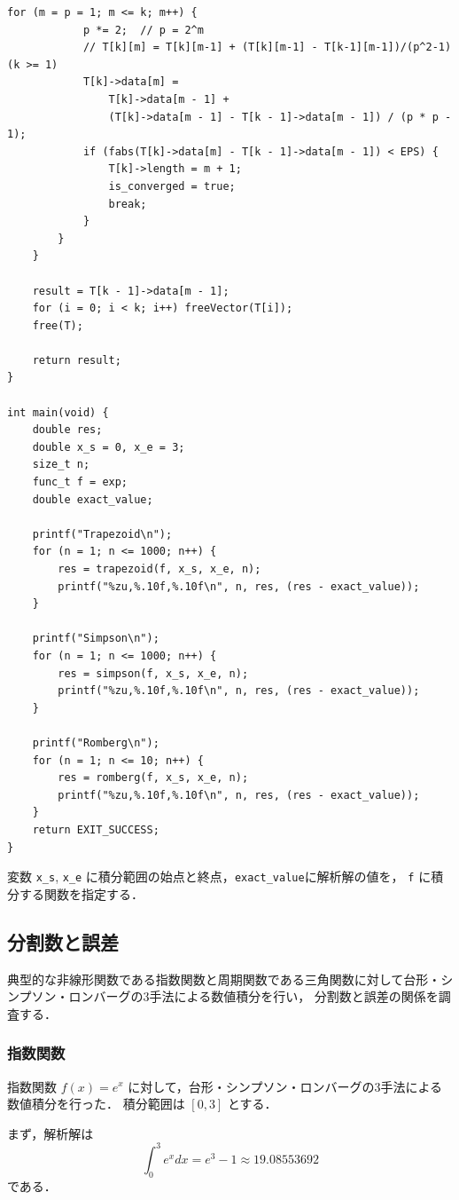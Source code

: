 \documentclass[gutter=20mm,fore-edge=20mm,head_space=30mm,foot_space=30mm]{jlreq}
\begin{document}
\begin{lstlisting}[caption=調査プログラム,label=lst:integral]
        for (m = p = 1; m <= k; m++) {
            p *= 2;  // p = 2^m
            // T[k][m] = T[k][m-1] + (T[k][m-1] - T[k-1][m-1])/(p^2-1) (k >= 1)
            T[k]->data[m] =
                T[k]->data[m - 1] +
                (T[k]->data[m - 1] - T[k - 1]->data[m - 1]) / (p * p - 1);
            if (fabs(T[k]->data[m] - T[k - 1]->data[m - 1]) < EPS) {
                T[k]->length = m + 1;
                is_converged = true;
                break;
            }
        }
    }

    result = T[k - 1]->data[m - 1];
    for (i = 0; i < k; i++) freeVector(T[i]);
    free(T);

    return result;
}

int main(void) {
    double res;
    double x_s = 0, x_e = 3;
    size_t n;
    func_t f = exp;
    double exact_value;

    printf("Trapezoid\n");
    for (n = 1; n <= 1000; n++) {
        res = trapezoid(f, x_s, x_e, n);
        printf("%zu,%.10f,%.10f\n", n, res, (res - exact_value));
    }

    printf("Simpson\n");
    for (n = 1; n <= 1000; n++) {
        res = simpson(f, x_s, x_e, n);
        printf("%zu,%.10f,%.10f\n", n, res, (res - exact_value));
    }

    printf("Romberg\n");
    for (n = 1; n <= 10; n++) {
        res = romberg(f, x_s, x_e, n);
        printf("%zu,%.10f,%.10f\n", n, res, (res - exact_value));
    }
    return EXIT_SUCCESS;
}
\end{lstlisting}

変数 \verb|x_s|, \verb|x_e| に積分範囲の始点と終点，\verb|exact_value|に解析解の値を，
\verb|f| に積分する関数を指定する．

\subsection{分割数と誤差}
典型的な非線形関数である指数関数と周期関数である三角関数に対して台形・シンプソン・ロンバーグの3手法による数値積分を行い，
分割数と誤差の関係を調査する．

\subsubsection{指数関数}
指数関数 $f(x) = e^x$ に対して，台形・シンプソン・ロンバーグの3手法による数値積分を行った．
積分範囲は $[0, 3]$ とする．

まず，解析解は
\begin{equation}
  \int_0^3 e^x dx = e^3 - 1 \approx 19.08553692
\end{equation}
である．
\end{document}
